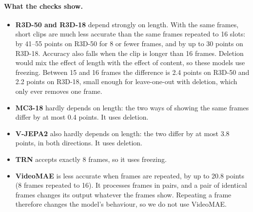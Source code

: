 \paragraph{What the checks show.}
\begin{itemize}
  \item \textbf{R3D-50 and R3D-18} depend strongly on length. With the same frames, short clips are much less accurate than the same frames repeated to 16 slots: by 41--55 points on R3D-50 for 8 or fewer frames, and by up to 30 points on R3D-18. Accuracy also falls when the clip is longer than 16 frames. Deletion would mix the effect of length with the effect of content, so these models use freezing. Between 15 and 16 frames the difference is 2.4 points on R3D-50 and 2.2 points on R3D-18, small enough for leave-one-out with deletion, which only ever removes one frame.
  \item \textbf{MC3-18} hardly depends on length: the two ways of showing the same frames differ by at most 0.4 points. It uses deletion.
  \item \textbf{V-JEPA2} also hardly depends on length: the two differ by at most 3.8 points, in both directions. It uses deletion.
  \item \textbf{TRN} accepts exactly 8 frames, so it uses freezing.
  \item \textbf{VideoMAE} is less accurate when frames are repeated, by up to 20.8 points (8 frames repeated to 16). It processes frames in pairs, and a pair of identical frames changes its output whatever the frames show. Repeating a frame therefore changes the model's behaviour, so we do not use VideoMAE.
\end{itemize}
